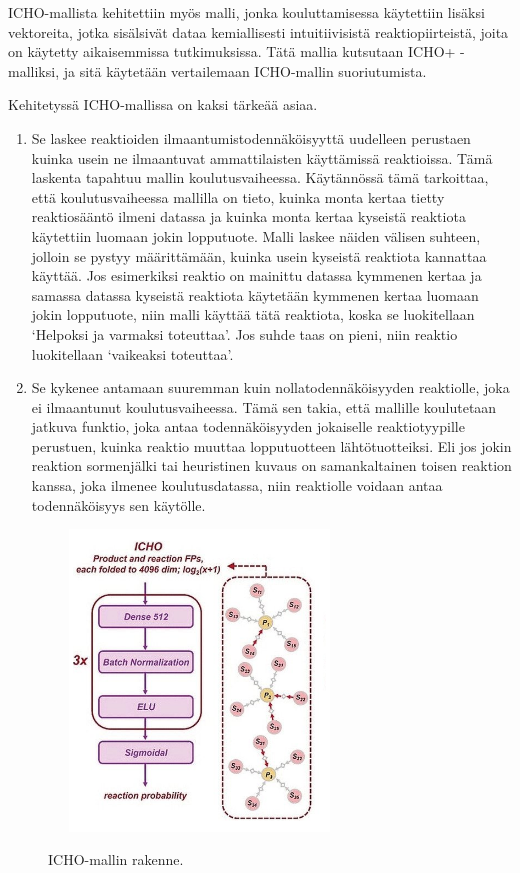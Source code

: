 \documentclass[finnish,twoside,censored,tkt,sw-line]{HYthesisML}
\begin{document}
ICHO-mallista kehitettiin myös malli, jonka kouluttamisessa käytettiin lisäksi vektoreita, jotka sisälsivät dataa kemiallisesti intuitiivisistä reaktiopiirteistä, joita on käytetty aikaisemmissa tutkimuksissa.
Tätä mallia kutsutaan ICHO+ -malliksi, ja sitä käytetään vertailemaan ICHO-mallin suoriutumista.

Kehitetyssä ICHO-mallissa on kaksi tärkeää asiaa.

\begin{enumerate}
    \item Se laskee reaktioiden ilmaantumistodennäköisyyttä uudelleen perustaen kuinka usein ne ilmaantuvat ammattilaisten käyttämissä reaktioissa.
          Tämä laskenta tapahtuu mallin koulutusvaiheessa.
          Käytännössä tämä tarkoittaa, että koulutusvaiheessa mallilla on tieto, kuinka monta kertaa tietty reaktiosääntö ilmeni datassa ja kuinka monta kertaa kyseistä reaktiota käytettiin luomaan jokin lopputuote.
          Malli laskee näiden välisen suhteen, jolloin se pystyy määrittämään, kuinka usein kyseistä reaktiota kannattaa käyttää.
          Jos esimerkiksi reaktio on mainittu datassa kymmenen kertaa ja samassa datassa kyseistä reaktiota käytetään kymmenen kertaa luomaan jokin lopputuote, niin malli käyttää tätä reaktiota, koska se luokitellaan `Helpoksi ja varmaksi toteuttaa'.
          Jos suhde taas on pieni, niin reaktio luokitellaan `vaikeaksi toteuttaa'.

    \item Se kykenee antamaan suuremman kuin nollatodennäköisyyden reaktiolle, joka ei ilmaantunut koulutusvaiheessa.
          Tämä sen takia, että mallille koulutetaan jatkuva funktio, joka antaa todennäköisyyden jokaiselle reaktiotyypille perustuen, kuinka reaktio muuttaa lopputuotteen lähtötuotteiksi.
          Eli jos jokin reaktion sormenjälki tai heuristinen kuvaus on samankaltainen toisen reaktion kanssa, joka ilmenee koulutusdatassa, niin reaktiolle voidaan antaa todennäköisyys sen käytölle.
\end{enumerate}

\begin{figure}[!ht]
    \centering
    \includegraphics[width=8cm, height=8cm]{icho-neuralnetwork.png}
    \caption{ICHO-mallin rakenne.}
    {\cite{ExpertKnowledgeRetorsynthesis}}
    {\label{fig:icho-neuralnetwork}}
\end{figure}
\end{document}
